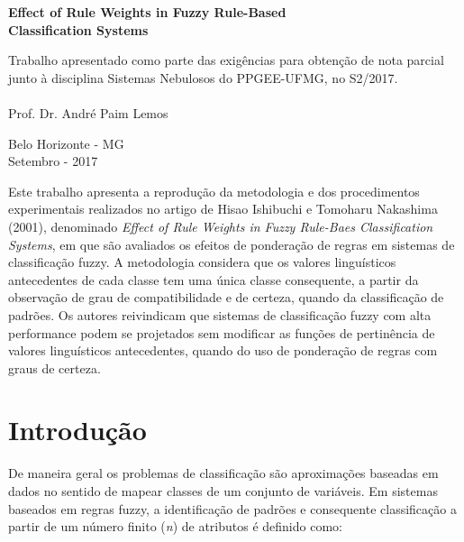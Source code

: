 \documentclass[12pt,a4paper]{article}
\numberwithin{equation}{section}
\begin{document}
\vspace{45 mm}
\begin{center}
\textbf{Effect of Rule Weights in Fuzzy Rule-Based \\
Classification Systems}\\
\end{center}

\vspace{25 mm}

\vspace{35mm}
\hspace{9cm}\begin{minipage}[r]{0.45\linewidth}
Trabalho apresentado como parte das exigências para obtenção de nota parcial junto à disciplina Sistemas Nebulosos do PPGEE-UFMG, no S2/2017.\\ 
\\
Prof. Dr. André Paim Lemos
\end{minipage}

\vspace{60mm}
\begin{center}
Belo Horizonte - MG\\
Setembro - 2017

\end{center}

\thispagestyle{empty}
\newpage
\tableofcontents
\newpage

\abstract
Este trabalho apresenta a reprodução da metodologia e dos procedimentos experimentais realizados no artigo de Hisao Ishibuchi e Tomoharu Nakashima (2001), denominado \textit{Effect of Rule Weights in Fuzzy Rule-Baes Classification Systems}, em que são avaliados os efeitos de ponderação de regras em sistemas de classificação fuzzy. A metodologia considera que os valores linguísticos antecedentes de cada classe tem uma única classe consequente, a partir da observação de grau de compatibilidade e de certeza, quando da classificação de padrões. Os autores reivindicam que sistemas de classificação fuzzy com alta performance podem se projetados sem modificar as funções de pertinência de valores linguísticos antecedentes, quando do uso de ponderação de regras com graus de certeza.
\newpage

\section{Introdução}


De maneira geral os problemas de classificação são aproximações baseadas em dados  no sentido de mapear classes de um conjunto de variáveis. Em sistemas baseados em regras fuzzy, a identificação de padrões e consequente classificação a partir de um número finito (\textit{n}) de atributos é definido como:
\end{document}

